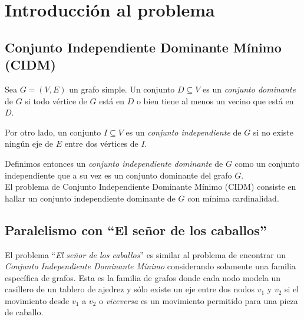 \section{Introducci\'on al problema}
\subsection{Conjunto Independiente Dominante M\'inimo (CIDM)}

Sea $G = (V, E)$ un grafo simple. Un conjunto $D \subseteq V$ es un \emph{conjunto dominante} de $G$ si todo v\'ertice de $G$ est\'a en $D$ o bien tiene al menos un vecino que est\'a en $D$.

Por otro lado, un conjunto $I \subseteq V$ es un \emph{conjunto independiente} de $G$ si no existe ning\'un eje de $E$ entre dos v\'ertices de $I$. 

Definimos entonces un \emph{conjunto independiente dominante} de $G$ como un conjunto independiente que a su vez es un conjunto dominante del grafo $G$.\\

El problema de Conjunto Independiente Dominante M\'inimo (CIDM) consiste en hallar un conjunto independiente dominante de $G$ con m\'inima cardinalidad.

\subsection{Paralelismo con ``El se\~nor de los caballos''}\label{caballitos}

El problema ``\emph{El se\~nor de los caballos}'' es similar al problema de encontrar un \emph{Conjunto Independiente Dominante M\'inimo} considerando solamente %
una familia específica de grafos. Esta es la familia de grafos donde cada nodo modela un casillero de un tablero de ajedrez y sólo existe un eje entre dos nodos $v_1$ y $v_2$ si el movimiento desde $v_1$ a $v_2$ o \textit{viceversa} es un movimiento permitido para una pieza de caballo.\\

